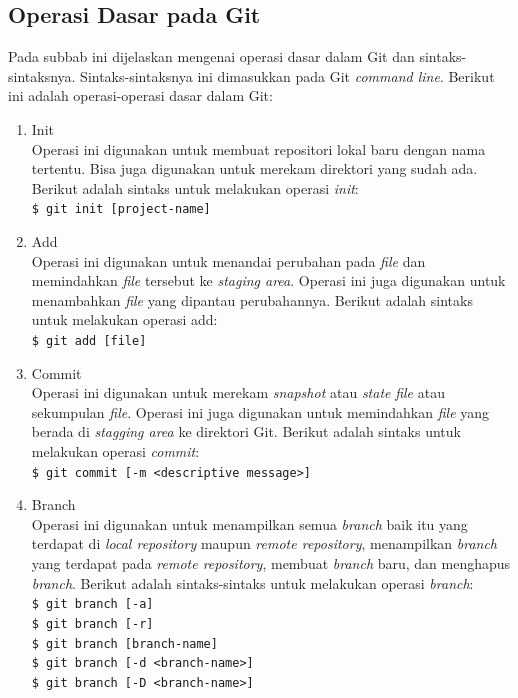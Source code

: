 \subsection{Operasi Dasar pada Git}
\label{subsec:operasi_dasar_git}
Pada subbab ini dijelaskan mengenai operasi dasar dalam Git dan sintaks-sintaksnya. Sintaks-sintaksnya ini dimasukkan pada Git \textit{command line}. Berikut ini adalah operasi-operasi dasar dalam Git:
\begin{enumerate}
\item Init\\
Operasi ini digunakan untuk membuat repositori lokal baru dengan nama tertentu. Bisa juga digunakan untuk merekam direktori yang sudah ada. Berikut adalah sintaks untuk melakukan operasi  \textit{init}:\\
\texttt{\$ git init [project-name]}  
\item Add\\
Operasi ini digunakan untuk menandai perubahan pada \textit{file} dan memindahkan \textit{file} tersebut ke \textit{staging area}. Operasi ini juga digunakan untuk menambahkan \textit{file} yang dipantau perubahannya. Berikut adalah sintaks untuk melakukan operasi add:\\
\texttt{\$ git add [file]}  
\item Commit\\
Operasi ini digunakan untuk merekam \textit{snapshot} atau \textit{state} \textit{file} atau sekumpulan \textit{file}. Operasi ini juga digunakan untuk memindahkan \textit{file} yang berada di \textit{stagging area} ke direktori Git. Berikut adalah sintaks untuk melakukan operasi \textit{commit}:\\
\texttt{\$ git commit [-m <descriptive message>]}  
\item Branch\\
Operasi ini digunakan untuk menampilkan semua \textit{branch} baik itu yang terdapat di \textit{local repository} maupun \textit{remote repository}, menampilkan \textit{branch} yang terdapat pada \textit{remote repository}, membuat \textit{branch} baru, dan menghapus \textit{branch}. Berikut adalah sintaks-sintaks untuk melakukan operasi \textit{branch}:\\
\texttt{\$ git branch [-a]}\\ 
\texttt{\$ git branch [-r]}\\
\texttt{\$ git branch [branch-name]}\\
\texttt{\$ git branch [-d <branch-name>]}\\
\texttt{\$ git branch [-D <branch-name>]} 

\end{enumerate}
